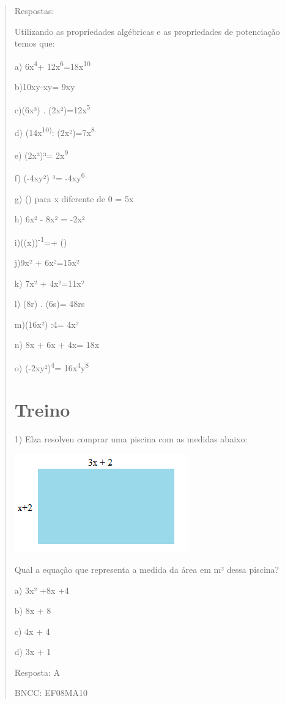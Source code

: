 \begin{quote}
\begin{escolha}
Respostas:

Utilizando as propriedades algébricas e as propriedades de potenciação
temos que:

a) 6x\textsuperscript{4}+ 12x\textsuperscript{6}=18x\textsuperscript{10}

b)10xy-xy= 9xy

c)(6x³) . (2x²)=12x\textsuperscript{5}

d) (14x\textsuperscript{10)}: (2x²)=7x\textsuperscript{8}

e) (2x³)³= 2x\textsuperscript{9}

f) (-4xy²) ³= -4xy\textsuperscript{6}

g) () para x diferente de 0 = 5x

h) 6x² - 8x² = -2x²

i)((x))\textsuperscript{-1}=+ ()

j)9x² + 6x²=15x²

k) 7x² + 4x²=11x²

l) (8r) . (6s)= 48rs

m)(16x²) :4= 4x²

n) 8x + 6x + 4x= 18x

o) (-2xy²)\textsuperscript{4}=
16x\textsuperscript{4}y\textsuperscript{8}

\section{Treino}

1) Elza resolveu comprar uma piscina com as medidas abaixo:

\includegraphics[width=2.9625in,height=1.67014in]{./imgSAEB_8_MAT/media/image6.png}

Qual a equação que representa a medida da área em m² dessa piscina?

a) 3x² +8x +4

b) 8x + 8

c) 4x + 4

d) 3x + 1

Resposta: A

BNCC: EF08MA10


\end{escolha}
\end{quote}
